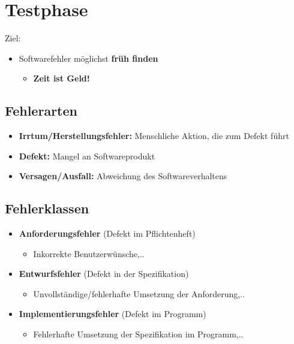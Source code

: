 \section{Testphase}
	
	Ziel:		
	\begin{itemize}
		\item Softwarefehler möglichst \textbf{früh finden}
		\begin{itemize}
			\item \textbf{Zeit ist Geld!}
		\end{itemize}
	\end{itemize}
		
	\subsection{Fehlerarten}
		
		\begin{itemize}
			\item \textbf{Irrtum/Herstellungsfehler:} Menschliche Aktion, die zum Defekt führt
			\item \textbf{Defekt:} Mangel an Softwareprodukt
			\item \textbf{Versagen/Ausfall:} Abweichung des Softwareverhaltens
		\end{itemize}
			
	\subsection{Fehlerklassen}
	
		\begin{itemize}
			\item \textbf{Anforderungsfehler} (Defekt im Pflichtenheft)
			\begin{itemize}
				\item Inkorrekte Benutzerwünsche,..
			\end{itemize}
			\item \textbf{Entwurfsfehler} (Defekt in der Spezifikation)
			\begin{itemize}
				\item Unvollständige/fehlerhafte Umsetzung der Anforderung,..
			\end{itemize}
			\item \textbf{Implementierungsfehler} (Defekt im Programm)
			\begin{itemize}
				\item Fehlerhafte Umsetzung der Spezifikation im Programm,..
			\end{itemize}
		\end{itemize}
		

